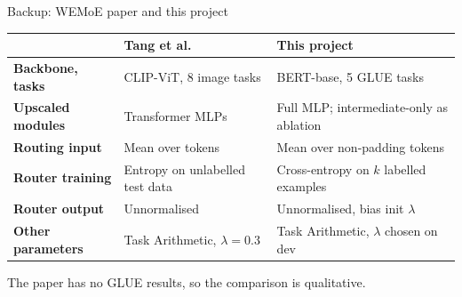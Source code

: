 \documentclass[aspectratio=169,10pt]{beamer}
\begin{document}
\begin{frame}{Backup: WEMoE paper and this project}
  \centering
  \small
  \begin{tabularx}{\linewidth}{>{\bfseries}p{2.6cm} X X}
    \toprule
    & Tang et al. & This project\\
    \midrule
    Backbone, tasks & CLIP-ViT, 8 image tasks & BERT-base, 5 GLUE tasks\\
    Upscaled modules & Transformer MLPs & Full MLP; intermediate-only as ablation\\
    Routing input & Mean over tokens & Mean over non-padding tokens\\
    Router training & Entropy on unlabelled test data & Cross-entropy on $k$ labelled examples\\
    Router output & Unnormalised & Unnormalised, bias init $\lambda$\\
    Other parameters & Task Arithmetic, $\lambda=0.3$ & Task Arithmetic, $\lambda$ chosen on dev\\
    \bottomrule
  \end{tabularx}
  \vfill
  \raggedright
  The paper has no GLUE results, so the comparison is qualitative.\cite{tang2024wemoe}
\end{frame}

\begin{hustreferencesframe}[title={References},subtitle={}]
\end{hustreferencesframe}
\end{document}

